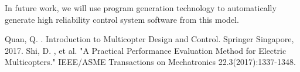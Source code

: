 \documentclass{article} %
\numberwithin{equation}{section} %
\begin{document}
In future work, we will use program generation technology to automatically generate high reliability control system software from this model.

\begin{thebibliography}{99}
 Quan, Q. . Introduction to Multicopter Design and Control. Springer Singapore, 2017.
 Shi, D. , et al. "A Practical Performance Evaluation Method for Electric Multicopters." IEEE/ASME Transactions on Mechatronics 22.3(2017):1337-1348.
\end{thebibliography}
\end{document}
